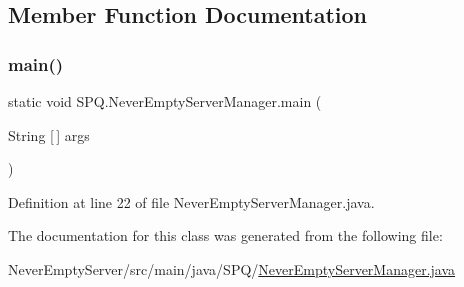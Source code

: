 \subsection{Member Function Documentation}
\mbox{\label{class_s_p_q_1_1_never_empty_server_manager_a999f5ecf0ed5f60f8661d0064420fdbd}} 
\subsubsection{\texorpdfstring{main()}{main()}}
{\footnotesize\ttfamily static void S\+P\+Q.\+Never\+Empty\+Server\+Manager.\+main (\begin{DoxyParamCaption}\item[{String \mbox{[}$\,$\mbox{]}}]{args }\end{DoxyParamCaption})\hspace{0.3cm}{\ttfamily [static]}}



Definition at line 22 of file Never\+Empty\+Server\+Manager.\+java.



The documentation for this class was generated from the following file\+:\begin{DoxyCompactItemize}
\item 
Never\+Empty\+Server/src/main/java/\+S\+P\+Q/\mbox{\hyperlink{_never_empty_server_manager_8java}{Never\+Empty\+Server\+Manager.\+java}}\end{DoxyCompactItemize}
